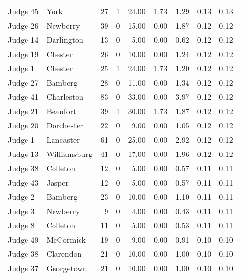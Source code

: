 \begin{tabular}{llrrrrrrr}
Judge 45 &         York &    27 &      1 & 24.00 &       1.73 &      1.29 &         0.13 &      0.13 \\
Judge 26 &     Newberry &    39 &      0 & 15.00 &       0.00 &      1.87 &         0.12 &      0.12 \\
Judge 14 &   Darlington &    13 &      0 &  5.00 &       0.00 &      0.62 &         0.12 &      0.12 \\
Judge 19 &      Chester &    26 &      0 & 10.00 &       0.00 &      1.24 &         0.12 &      0.12 \\
 Judge 1 &      Chester &    25 &      1 & 24.00 &       1.73 &      1.20 &         0.12 &      0.12 \\
Judge 27 &      Bamberg &    28 &      0 & 11.00 &       0.00 &      1.34 &         0.12 &      0.12 \\
Judge 41 &   Charleston &    83 &      0 & 33.00 &       0.00 &      3.97 &         0.12 &      0.12 \\
Judge 21 &     Beaufort &    39 &      1 & 30.00 &       1.73 &      1.87 &         0.12 &      0.12 \\
Judge 20 &   Dorchester &    22 &      0 &  9.00 &       0.00 &      1.05 &         0.12 &      0.12 \\
 Judge 1 &    Lancaster &    61 &      0 & 25.00 &       0.00 &      2.92 &         0.12 &      0.12 \\
Judge 13 & Williamsburg &    41 &      0 & 17.00 &       0.00 &      1.96 &         0.12 &      0.12 \\
Judge 38 &     Colleton &    12 &      0 &  5.00 &       0.00 &      0.57 &         0.11 &      0.11 \\
Judge 43 &       Jasper &    12 &      0 &  5.00 &       0.00 &      0.57 &         0.11 &      0.11 \\
 Judge 2 &      Bamberg &    23 &      0 & 10.00 &       0.00 &      1.10 &         0.11 &      0.11 \\
 Judge 3 &     Newberry &     9 &      0 &  4.00 &       0.00 &      0.43 &         0.11 &      0.11 \\
 Judge 8 &     Colleton &    11 &      0 &  5.00 &       0.00 &      0.53 &         0.11 &      0.11 \\
Judge 49 &    McCormick &    19 &      0 &  9.00 &       0.00 &      0.91 &         0.10 &      0.10 \\
Judge 38 &    Clarendon &    21 &      0 & 10.00 &       0.00 &      1.00 &         0.10 &      0.10 \\
Judge 37 &   Georgetown &    21 &      0 & 10.00 &       0.00 &      1.00 &         0.10 &      0.10 \\

\end{tabular}
